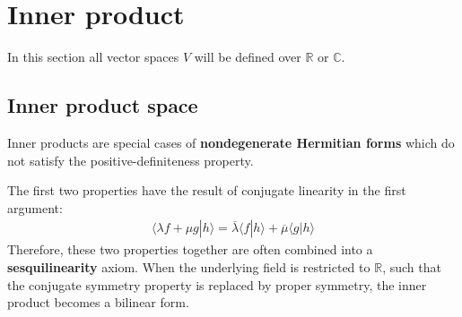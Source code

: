 \section{Inner product}\label{section:innerproduct}

    In this section all vector spaces $V$ will be defined over $\mathbb{R}$ or $\mathbb{C}$.

\subsection{Inner product space}

    \begin{remark}\label{linalgebra:NDH_form}
        Inner products are special cases of \textbf{nondegenerate Hermitian forms} which do not satisfy the positive-definiteness property.
    \end{remark}
    \begin{result}
        The first two properties have the result of conjugate linearity in the first argument:
        \begin{gather}
            \langle \lambda f + \mu g|h \rangle = \overline{\lambda}\langle f|h \rangle + \overline{\mu}\langle g|h \rangle
        \end{gather}
        Therefore, these two properties together are often combined into a \textbf{sesquilinearity} axiom. When the underlying field is restricted to $\mathbb{R}$, such that the conjugate symmetry property is replaced by proper symmetry, the inner product becomes a bilinear form.
    \end{result}

